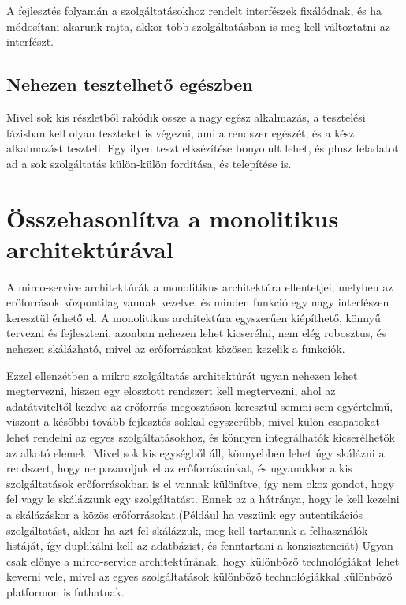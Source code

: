 \documentclass[11pt,magyar,a4paper,oneside,]{report}
\begin{document}
A fejlesztés folyamán a szolgáltatásokhoz rendelt interfészek
fixálódnak, és ha módosítani akarunk rajta, akkor több szolgáltatásban
is meg kell változtatni az interfészt.

\subsection{Nehezen tesztelhető
egészben}\label{nehezen-tesztelhetux151-eguxe9szben}

Mivel sok kis részletből rakódik össze a nagy egész alkalmazás, a
tesztelési fázisban kell olyan teszteket is végezni, ami a rendszer
egészét, és a kész alkalmazást teszteli. Egy ilyen teszt elksézítése
bonyolult lehet, és plusz feladatot ad a sok szolgáltatás külön-külön
fordítása, és telepítése is.

\section{Összehasonlítva a monolitikus
architektúrával}\label{uxf6sszehasonluxedtva-a-monolitikus-architektuxfaruxe1val}

A mirco-service architektúrák a monolitikus architektúra ellentetjei,
melyben az erőforrások központilag vannak kezelve, és minden funkció egy
nagy interfészen keresztül érhető el. A monolitikus architektúra
egyszerűen kiépíthető, könnyű tervezni és fejleszteni, azonban nehezen
lehet kicserélni, nem elég robosztus, és nehezen skálázható, mivel az
erőforrásokat közösen kezelik a funkciók.

Ezzel ellenzétben a mikro szolgáltatás architektúrát ugyan nehezen lehet
megtervezni, hiszen egy elosztott rendszert kell megtervezni, ahol az
adatátviteltől kezdve az erőforrás megosztáson keresztül semmi sem
egyértelmű, viszont a későbbi tovább fejlesztés sokkal egyszerűbb, mivel
külön csapatokat lehet rendelni az egyes szolgáltatásokhoz, és könnyen
integrálhatók kicserélhetők az alkotó elemek. Mivel sok kis egységből
áll, könnyebben lehet úgy skálázni a rendszert, hogy ne pazaroljuk el az
erőforrásainkat, és ugyanakkor a kis szolgáltatások erőforrásokban is el
vannak különítve, így nem okoz gondot, hogy fel vagy le skálázzunk egy
szolgáltatást. Ennek az a hátránya, hogy le kell kezelni a skálázáskor a
közös erőforrásokat.(Például ha veszünk egy autentikációs szolgáltatást,
akkor ha azt fel skálázzuk, meg kell tartanunk a felhasználók listáját,
így duplikálni kell az adatbázist, és fenntartani a konzisztenciát)
Ugyan csak előnye a mirco-service architektúrának, hogy különböző
technológiákat lehet keverni vele, mivel az egyes szolgáltatások
különböző technológiákkal különböző platformon is futhatnak.
\end{document}
